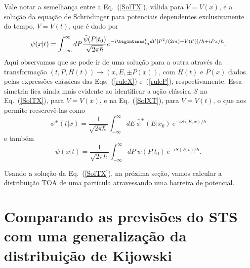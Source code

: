 Vale notar a semelhança entre a Eq.~(\ref{SolTX}), válida para $V=V(x)$, e a solução da equação de Schrödinger para potenciais dependentes exclusivamente do tempo, $V=V (t)$, que é dado por
\begin{equation}\label{SolXT}
\psi(x|t)=\int_{-\infty}^{\infty} dP \frac{{\tilde \psi}(P|t_0)}{\sqrt{2\pi \hbar}} e^{-i\bigintssss_{t_0}^t dt'[{P^2}/(2m)+V(t')]/\hbar +iPx/\hbar}.
\end{equation}
Aqui observamos que se pode ir de uma solução para a outra através da transformação $(t,P,H(t)) \rightarrow (x,E,\pm P(x))$, com $H(t)$ e $P(x)$ dados pelas expressões clássicas das Eqs.~(\ref{ruleX}) e~(\ref{ruleP}), respectivamente. Essa simetria fica ainda mais evidente ao identificar a ação clássica $S$ na Eq.~(\ref{SolTX}), para $V=V(x)$, e na Eq.~(\ref{SolXT}), para $V=V(t)$, o que nos permite reescrevê-las como
\begin{equation}
\phi^\pm(t|x)=\frac{1}{\sqrt{2\pi \hbar}}\int_{-\infty}^{\infty} dE~ {\bar \phi}^\pm(E|x_0)~e^{-iS(E,x)/\hbar}
\end{equation}
e também
\begin{equation}
\psi(x|t)=\frac{1}{\sqrt{2\pi \hbar}}\int_{-\infty}^{\infty}d{P}~ {\tilde \psi}(P|t_0)~e^{-iS(P,t)/\hbar}.
\end{equation}

Usando a solução da Eq.~(\ref{SolTX}), na próxima seção, vamos calcular a distribuição TOA de uma partícula atravessando uma barreira de potencial.


\section{Comparando as previsões do STS com uma generalização da distribuição de Kijowski}
\label{sec:comparandosol}

